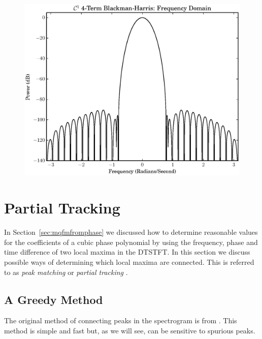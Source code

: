 \begin{figure}[!t]
    \caption{}
    \includegraphics[width=\textwidth]{plots/c1_blackman_fd.eps}
\end{figure}

\section{\label{sec:partialtracking}Partial Tracking}

In Section~\ref{sec:mqfmfromphase} we discussed how to determine reasonable
values for the coefficients of a cubic phase polynomial by using the frequency,
phase and time difference of two local maxima in the DTSTFT. In this section we
discuss possible ways of determining which local maxima are connected. This is
referred to as \textit{peak matching} \cite{mcaulay1986speech}
or \textit{partial tracking} \cite{smith1987parshl} \cite{depalle1993tracking}.

\subsection{A Greedy Method}

The original method of connecting peaks in the spectrogram is from
\cite{mcaulay1986speech}. This method is simple and fast but, as we will see,
can be sensitive to spurious peaks.

